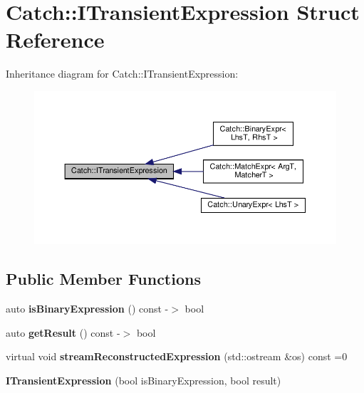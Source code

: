\hypertarget{structCatch_1_1ITransientExpression}{}\section{Catch\+::I\+Transient\+Expression Struct Reference}
\label{structCatch_1_1ITransientExpression}


Inheritance diagram for Catch\+::I\+Transient\+Expression\+:
\nopagebreak
\begin{figure}[H]
\begin{center}
\leavevmode
\includegraphics[width=350pt]{structCatch_1_1ITransientExpression__inherit__graph}
\end{center}
\end{figure}
\subsection*{Public Member Functions}
\begin{DoxyCompactItemize}
\item 
\mbox{\label{structCatch_1_1ITransientExpression_a3b436e13a0a6d3522bbf70d4e31deb22}} 
auto {\bfseries is\+Binary\+Expression} () const -\/$>$ bool
\item 
\mbox{\label{structCatch_1_1ITransientExpression_a101c7db86c87eff93a8ff496720e6320}} 
auto {\bfseries get\+Result} () const -\/$>$ bool
\item 
\mbox{\label{structCatch_1_1ITransientExpression_aabe1889df9c6e639a24afb08d8a0fe9e}} 
virtual void {\bfseries stream\+Reconstructed\+Expression} (std\+::ostream \&os) const =0
\item 
\mbox{\label{structCatch_1_1ITransientExpression_aafe69572b7ed884e63ec81f58d4afd8c}} 
{\bfseries I\+Transient\+Expression} (bool is\+Binary\+Expression, bool result)
\end{DoxyCompactItemize}
